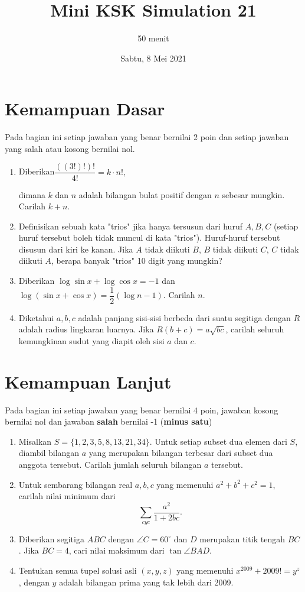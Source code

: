 \documentclass{article}
\title{Mini KSK Simulation 21}
\author{50 menit}
\date{Sabtu, 8 Mei 2021}
\begin{document}
	\maketitle
	
	\section{Kemampuan Dasar}
	Pada bagian ini setiap jawaban yang benar bernilai 2 poin dan setiap jawaban yang salah
	atau kosong bernilai nol.
	\begin{enumerate}
		\item Diberikan$ \dfrac{((3!)!)!}{4!} = k \cdot n!, $
		
		dimana $ k $ dan $ n $ adalah bilangan bulat positif dengan $ n $ sebesar mungkin. Carilah $ k + n. $
		
		\item Definisikan sebuah kata "trios" jika hanya tersusun dari huruf $A,B,C$ (setiap huruf tersebut boleh tidak muncul di kata "trios"). Huruf-huruf tersebut disusun dari kiri ke kanan. Jika $A$ tidak diikuti $B$, $B$ tidak diikuti $C$, $C$ tidak diikuti $A$, berapa banyak "trios" 10 digit yang mungkin?
		
		\item Diberikan $\log \sin x + \log \cos x = -1$ dan $\log (\sin x+\cos x) = \dfrac{1}{2}(\log n - 1)$. Carilah $n$.
		
		
		
		\item Diketahui $a,b,c$ adalah panjang sisi-sisi berbeda dari suatu segitiga dengan $R$ adalah radius lingkaran luarnya. Jika $R(b+c)=a\sqrt{bc}$, carilah seluruh kemungkinan sudut yang diapit oleh sisi $a$ dan $c$.
		
	\end{enumerate}

\section{Kemampuan Lanjut}
Pada bagian ini setiap jawaban yang benar bernilai 4 poin, jawaban kosong bernilai nol
dan jawaban \textbf{salah} bernilai -1 (\textbf{minus satu})

\begin{enumerate}[resume]
		\item Misalkan  $S = \{1,2,3,5,8,13,21,34\}$. Untuk setiap subset dua elemen dari $S$, diambil bilangan $a$ yang merupakan bilangan terbesar dari subset dua anggota tersebut. Carilah jumlah seluruh bilangan $a$ tersebut.
	
		\item Untuk sembarang bilangan real $a,b,c$ yang memenuhi $a^2+b^2+c^2=1$, carilah nilai minimum dari $$\sum_{cyc}^{} \frac{a^2}{1+2bc}.$$
		
		\item Diberikan segitiga $ABC$ dengan $\angle C = 60^\circ$ dan $D$ merupakan titik tengah $BC$. Jika $BC=4$, cari nilai maksimum dari $\tan \angle BAD$.
		
		\item Tentukan semua tupel solusi asli $(x,y,z)$ yang memenuhi $x^{2009}+2009!=y^z$, dengan $y$ adalah bilangan prima yang tak lebih dari 2009.

\end{enumerate}
\end{document}
